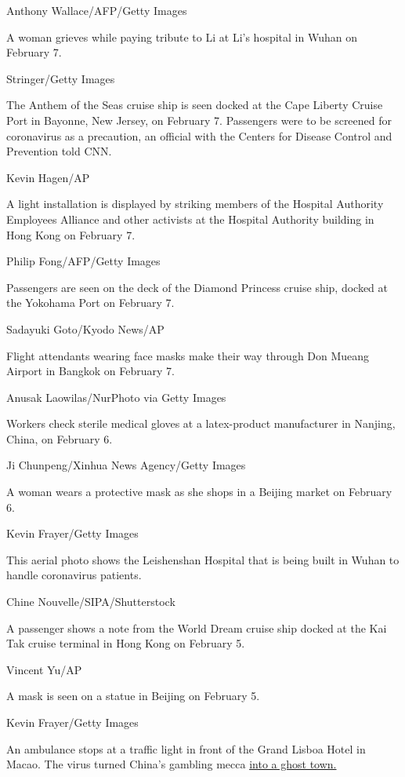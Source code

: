 Anthony Wallace/AFP/Getty Images

A woman grieves while paying tribute to Li at Li's hospital in Wuhan on
February 7.

Stringer/Getty Images

The Anthem of the Seas cruise ship is seen docked at the Cape Liberty
Cruise Port in Bayonne, New Jersey, on February 7. Passengers were to be
screened for coronavirus as a precaution, an official with the Centers
for Disease Control and Prevention told CNN.

Kevin Hagen/AP

A light installation is displayed by striking members of the Hospital
Authority Employees Alliance and other activists at the Hospital
Authority building in Hong Kong on February 7.

Philip Fong/AFP/Getty Images

Passengers are seen on the deck of the Diamond Princess cruise ship,
docked at the Yokohama Port on February 7.

Sadayuki Goto/Kyodo News/AP

Flight attendants wearing face masks make their way through Don Mueang
Airport in Bangkok on February 7.

Anusak Laowilas/NurPhoto via Getty Images

Workers check sterile medical gloves at a latex-product manufacturer in
Nanjing, China, on February 6.

Ji Chunpeng/Xinhua News Agency/Getty Images

A woman wears a protective mask as she shops in a Beijing market on
February 6.

Kevin Frayer/Getty Images

This aerial photo shows the Leishenshan Hospital that is being built in
Wuhan to handle coronavirus patients.

Chine Nouvelle/SIPA/Shutterstock

A passenger shows a note from the World Dream cruise ship docked at the
Kai Tak cruise terminal in Hong Kong on February 5.

Vincent Yu/AP

A mask is seen on a statue in Beijing on February 5.

Kevin Frayer/Getty Images

An ambulance stops at a traffic light in front of the Grand Lisboa Hotel
in Macao. The virus turned China's gambling mecca
\href{https://www.cnn.com/2020/02/03/asia/china-virus-macao-gambling-intl-hnk/index.html}{into
a ghost town.}


